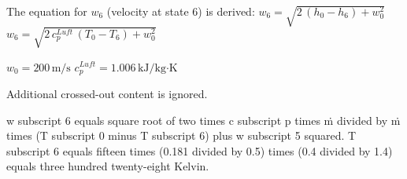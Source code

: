 The equation for \( w_6 \) (velocity at state 6) is derived:  
\( w_6 = \sqrt{2 \, (h_0 - h_6) + w_0^2} \)  
\( w_6 = \sqrt{2 \, c_{p}^{Luft} \, (T_0 - T_6) + w_0^2} \)  

\( w_0 = 200 \, \text{m/s} \)  
\( c_{p}^{Luft} = 1.006 \, \text{kJ/kg·K} \)  

Additional crossed-out content is ignored.

w subscript 6 equals square root of two times c subscript p times ṁ divided by ṁ times (T subscript 0 minus T subscript 6) plus w subscript 5 squared.  
T subscript 6 equals fifteen times (0.181 divided by 0.5) times (0.4 divided by 1.4) equals three hundred twenty-eight Kelvin.